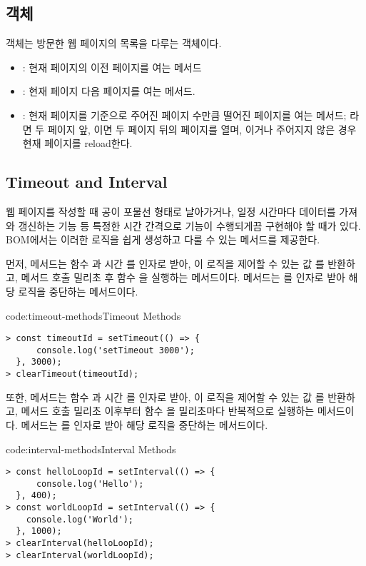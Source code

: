 \subsection*{ 객체}

 객체는 방문한 웹 페이지의 목록을 다루는 객체이다.

\begin{itemize}
    \item {}: 현재 페이지의 이전 페이지를 여는 메서드
    \item {}: 현재 페이지 다음 페이지를 여는 메서드.
    \item {}: 현재 페이지를 기준으로 주어진 페이지 수만큼 떨어진 페이지를 여는 메서드; 라면 두 페이지 앞, 이면 두 페이지 뒤의 페이지를 열며, 이거나 주어지지 않은 경우 현재 페이지를 reload한다.
\end{itemize}

\subsection*{Timeout and Interval}

웹 페이지를 작성할 때 공이 포물선 형태로 날아가거나, 일정 시간마다 데이터를 가져와 갱신하는 기능 등 특정한 시간 간격으로 기능이 수행되게끔 구현해야 할 때가 있다. BOM에서는 이러한 로직을 쉽게 생성하고 다룰 수 있는 메서드를 제공한다.

먼저,  메서드는 함수 과 시간 를 인자로 받아, 이 로직을 제어할 수 있는 값 를 반환하고, 메서드 호출  밀리초 후 함수 을 실행하는 메서드이다.  메서드는 를 인자로 받아 해당 로직을 중단하는 메서드이다.

\begin{codeenv}{code:timeout-methods}{Timeout Methods}\begin{verbatim}
> const timeoutId = setTimeout(() => {
      console.log('setTimeout 3000');
  }, 3000);
> clearTimeout(timeoutId);
\end{verbatim}
\end{codeenv}

또한,  메서드는 함수 과 시간 를 인자로 받아, 이 로직을 제어할 수 있는 값 를 반환하고, 메서드 호출  밀리초 이후부터 함수 을  밀리초마다 반복적으로 실행하는 메서드이다.  메서드는 를 인자로 받아 해당 로직을 중단하는 메서드이다.

\begin{codeenv}{code:interval-methods}{Interval Methods}\begin{verbatim}
> const helloLoopId = setInterval(() => {
      console.log('Hello');
  }, 400);
> const worldLoopId = setInterval(() => {
    console.log('World');
  }, 1000);
> clearInterval(helloLoopId);
> clearInterval(worldLoopId);
\end{verbatim}
\end{codeenv}
